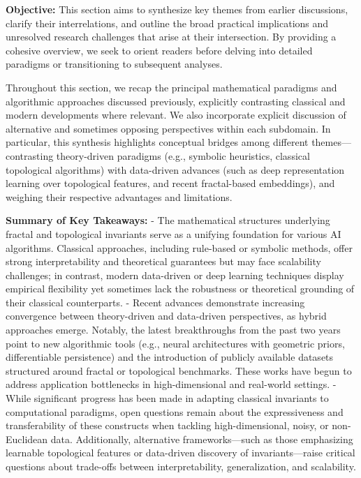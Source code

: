 \documentclass[sigconf]{acmart}
\begin{document}
\textbf{Objective:} This section aims to synthesize key themes from earlier discussions, clarify their interrelations, and outline the broad practical implications and unresolved research challenges that arise at their intersection. By providing a cohesive overview, we seek to orient readers before delving into detailed paradigms or transitioning to subsequent analyses.

Throughout this section, we recap the principal mathematical paradigms and algorithmic approaches discussed previously, explicitly contrasting classical and modern developments where relevant. We also incorporate explicit discussion of alternative and sometimes opposing perspectives within each subdomain. In particular, this synthesis highlights conceptual bridges among different themes—contrasting theory-driven paradigms (e.g., symbolic heuristics, classical topological algorithms) with data-driven advances (such as deep representation learning over topological features, and recent fractal-based embeddings), and weighing their respective advantages and limitations.

\vspace{0.5em}

\textbf{Summary of Key Takeaways:}
- The mathematical structures underlying fractal and topological invariants serve as a unifying foundation for various AI algorithms. Classical approaches, including rule-based or symbolic methods, offer strong interpretability and theoretical guarantees but may face scalability challenges; in contrast, modern data-driven or deep learning techniques display empirical flexibility yet sometimes lack the robustness or theoretical grounding of their classical counterparts.
- Recent advances demonstrate increasing convergence between theory-driven and data-driven perspectives, as hybrid approaches emerge. Notably, the latest breakthroughs from the past two years point to new algorithmic tools (e.g., neural architectures with geometric priors, differentiable persistence) and the introduction of publicly available datasets structured around fractal or topological benchmarks. These works have begun to address application bottlenecks in high-dimensional and real-world settings.
- While significant progress has been made in adapting classical invariants to computational paradigms, open questions remain about the expressiveness and transferability of these constructs when tackling high-dimensional, noisy, or non-Euclidean data. Additionally, alternative frameworks—such as those emphasizing learnable topological features or data-driven discovery of invariants—raise critical questions about trade-offs between interpretability, generalization, and scalability.
\end{document}
